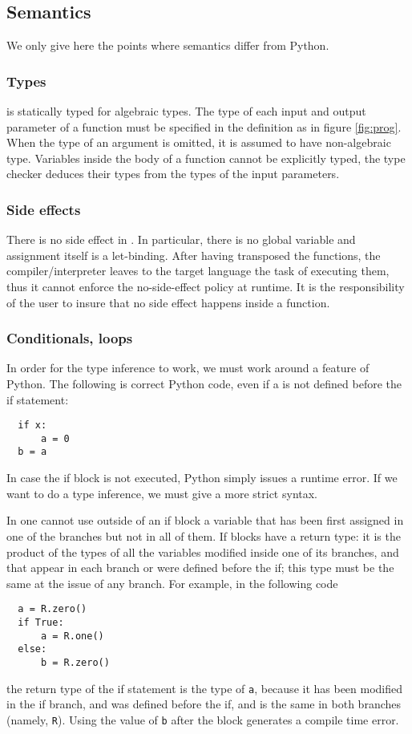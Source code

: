 \subsection{Semantics}
We only give here the points where \tALpy{} semantics differ from
Python.

\subsubsection{Types}
\tALpy{} is statically typed for algebraic types. The type of each
input and output parameter of a function must be specified in the
definition as in figure \ref{fig:prog}. When the type of an argument
is omitted, it is assumed to have non-algebraic type. Variables inside
the body of a function cannot be explicitly typed, the type checker
deduces their types from the types of the input parameters.

\subsubsection{Side effects}
There is no side effect in \tALpy{}. In particular, there is no global
variable and assignment itself is a let-binding. After having
transposed the functions, the \tALpy{} compiler/interpreter leaves to
the target language the task of executing them, thus it cannot enforce
the no-side-effect policy at runtime. It is the responsibility of the
user to insure that no side effect happens inside a \tALpy{} function.

\subsubsection{Conditionals, loops}
\label{sec:conditionals-loops}
In order for the type inference to work, we must work around a feature
of Python. The following is correct Python code, even if a is not
defined before the if statement:
\begin{lstlisting}
  if x:
      a = 0
  b = a
\end{lstlisting}
In case the if block is not executed, Python simply issues a runtime
error. If we want to do a type inference, we must give a more strict
syntax.

In \tALpy{} one cannot use outside of an if block a variable that has
been first assigned in one of the branches but not in all of them.  If
blocks have a return type: it is the product of the types of all the
variables modified inside one of its branches, and that appear in each
branch or were defined before the if; this type must be the same at
the issue of any branch. For example, in the following code
\begin{lstlisting}
  a = R.zero()
  if True:
      a = R.one()
  else:
      b = R.zero()
\end{lstlisting}
the return type of the if statement is the type of \lstinline{a},
because it has been modified in the if branch, and was defined before
the if, and is the same in both branches (namely,
\lstinline{R}). Using the value of \lstinline{b} after the block
generates a compile time error.

